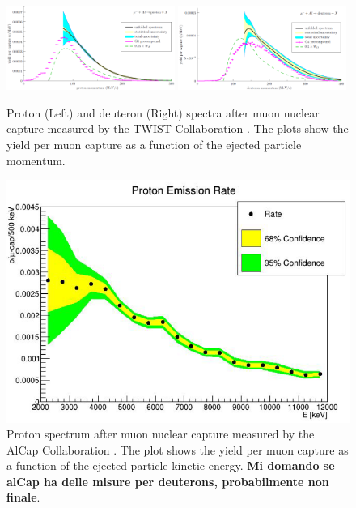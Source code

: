 \documentclass[12pt,a4paper,openright, oneside, titlepage]{book} %
\begin{document}
\begin{figure}[h!]
\centering
\includegraphics[width=0.49\textwidth]{new_spectra_2/Gaponenko_protons}\hfill
\includegraphics[width=0.49\textwidth]{new_spectra_2/Gaponenko_deuterons}
\caption[TWIST measured spectra]{Proton (Left) and deuteron (Right) spectra after muon nuclear capture measured
by the TWIST Collaboration \cite{TWIST:2020}. The plots show
the yield per muon capture as a function of the ejected particle momentum.}
\label{_TWIST}
\end{figure}

\begin{figure}[h!]
\centering
\includegraphics[scale=0.6]{new_spectra_2/Quirk_protons}
\caption[AlCap measured spectra]{Proton spectrum after muon nuclear capture measured by the AlCap Collaboration \cite{AlCap:2020}. 
The plot shows the yield per muon capture as a function of the ejected particle kinetic energy.
{\bf{Mi domando se alCap ha delle misure per deuterons, probabilmente non finale}}.}
\label{_AlCap}
\end{figure}
\end{document}
